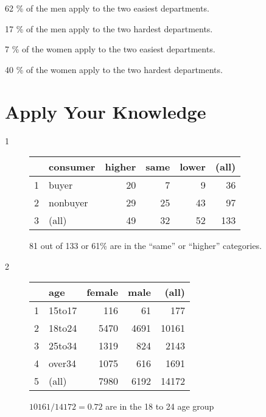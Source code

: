 \documentclass[landscape]{exam}
\begin{document}
  \begin{itemize*}
    \item 62 \% of the men apply to the two easiest departments.
    \item 17 \% of the men apply to the two hardest departments.
    \item 7 \% of the women apply to the two easiest departments.
    \item 40 \% of the women apply to the two hardest departments.
  \end{itemize*}

  \section{Apply Your Knowledge}

  \begin{description}
    \item[1] 
      \begin{table}[H]
        \centering
        \begin{tabular}{rlrrrr}
          \toprule
                   & consumer & higher & same & lower & (all) \\
          \midrule
          1        & buyer    & 20     & 7    & 9     & 36 \\
          2        & nonbuyer & 29     & 25   & 43    & 97 \\
          3        & (all)    & 49     & 32   & 52    & 133 \\
          \bottomrule
        \end{tabular}
      \end{table}

    81 out of 133 or 61\% are in the ``same'' or ``higher'' categories.

    \item[2]
      \begin{table}[H]
        \centering
        \begin{tabular}{rlrrr}
          \toprule
                   & age    & female & male & (all) \\
          \midrule
          1        & 15to17 & 116    & 61   & 177 \\
          2        & 18to24 & 5470   & 4691 & 10161 \\
          3        & 25to34 & 1319   & 824  & 2143 \\
          4        & over34 & 1075   & 616  & 1691 \\
          5        & (all)  & 7980   & 6192 & 14172 \\
          \bottomrule
        \end{tabular}
      \end{table}

      $10161 / 14172 = 0.72$ are in the 18 to 24 age group

  \end{description}
\end{document}
